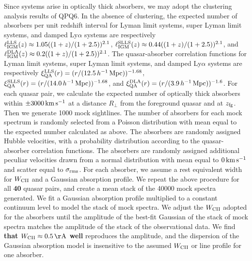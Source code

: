 \documentclass[iop]{emulateapj}
\begin{document}
{Since  systems arise in optically thick absorbers, we may adopt the clustering analysis 
results of QPQ6. In the absence of clustering, the expected number of absorbers per unit redshift 
interval for Lyman limit systems, super Lyman limit systems, and damped Ly$\alpha$ systems are 
respectively $\ell_{\rm IGM}^{\rm LLS}(z)\approx1.05((1+z)/(1+2.5))^{2.1}$, 
$\ell_{\rm IGM}^{\rm SLLS}(z)\approx0.44((1+z)/(1+2.5))^{2.1}$, and 
$\ell_{\rm IGM}^{\rm DLA}(z)\approx0.2((1+z)/(1+2.5))^{2.1}$. The quasar-absorber correlation 
functions for Lyman limit systems, super Lyman limit systems, and damped Ly$\alpha$ systems are 
respectively $\xi_{\rm QA}^{\rm LLS}(r)=(r/(12.5\,h^{-1}\,{\rm Mpc}))^{-1.68}$, 
$\xi_{\rm QA}^{\rm SLLS}(r)=(r/(14.0\,h^{-1}\,{\rm Mpc}))^{-1.68}$, and 
$\xi_{\rm QA}^{\rm DLA}(r)=(r/(3.9\,h^{-1}\,{\rm Mpc}))^{-1.6}$. 
For each quasar pair, we calculate the expected number of optically thick absorbers within 
$\pm3000\,{\rm km\,s^{-1}}$ at a distance $R_\perp$ from the foreground quasar and at 
$z_{\rm fg}$. Then we generate 1000 mock sightlines. The number of absorbers for each mock 
spectrum is randomly selected from a Poisson distribution with mean equal to the expected number 
calculated as above. The absorbers are randomly assigned Hubble velocities, with a probability 
distribution according to the quasar-absorber correlation functions. The absorbers are randomly 
assigned additional peculiar velocities drawn from a normal distribution with mean equal to 
$0\,{\rm km\,s^{-1}}$ and scatter equal to $\sigma_{\rm rms}$. For each absorber, we assume a rest
equivalent width for  $W_{\rm CII}$ and a Gaussian absorption profile. We repeat the 
above procedure for all {\bf 40} quasar pairs, and create a mean stack of the 40000 mock spectra
generated. We fit a Gaussian absorption profile multiplied to a constant continuum level to model 
the stack of mock spectra. We adjust the $W_{\rm CII}$ adopted for the absorbers until the 
amplitude of the best-fit Gaussian of the stack of mock spectra matches the amplitude of the stack
of the observational data. We find {\bf that $W_{\rm CII}\approx0.5\,{\rm \AA}$ well} reproduces the
amplitude, and the dispersion of the Gaussian absorption model is insensitive to the assumed
$W_{\rm CII}$ or line profile for one absorber.

}
\end{document}
